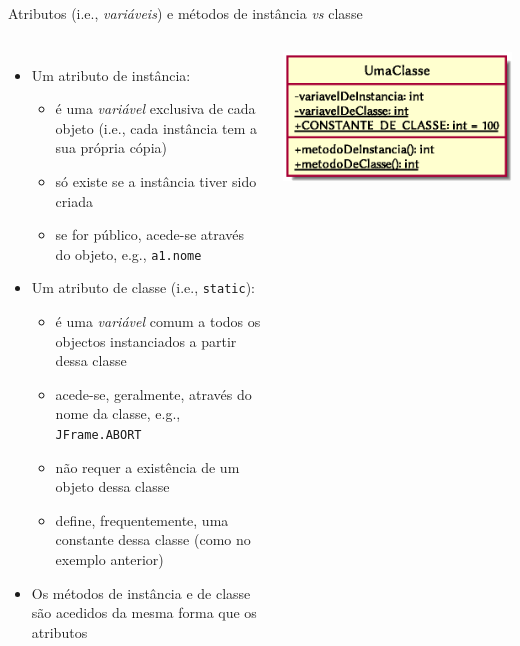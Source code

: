 \documentclass[portuguese, aspectratio=169, xcolor=table]{beamer}
\begin{document}
\begin{frame}{Atributos (i.e., \textit{variáveis}) e métodos de instância \textit{vs} classe}
\begin{columns}
\begin{itemize}
    \item Um atributo de instância:
    \begin{itemize}
        \item é uma \textit{variável} exclusiva de cada objeto (i.e., cada instância tem a sua própria cópia)
        \item só existe se a instância tiver sido criada
        \item se for público, acede-se através do objeto, e.g., \texttt{a1.nome}
    \end{itemize}
    \item Um atributo de classe (i.e., \texttt{static}):
    \begin{itemize}
        \item é uma \textit{variável} comum a todos os objectos instanciados a partir dessa classe
        \item acede-se, geralmente, através do nome da classe, e.g., \texttt{JFrame.ABORT}
        \item não requer a existência de um objeto dessa classe
        \item define, frequentemente, uma constante dessa classe (como no exemplo anterior)
    \end{itemize}
    \item Os métodos de instância e de classe são acedidos da mesma forma que os atributos
\end{itemize}
\begin{center}
    \includegraphics[width=\linewidth]{./uml_diagrams/class6}
\end{center}
\end{columns}
\end{frame}  
\end{document}
